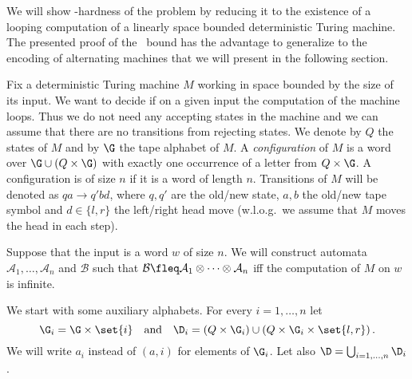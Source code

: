 \documentclass{LMCS}
\theoremstyle{plain}\newtheorem{remark}{Remark}
\theoremstyle{plain}\newtheorem{lemma}[thm]{Lemma}
\renewcommand{\Aa}{\mathcal{A}}
\renewcommand{\Bb}{\mathcal{B}}
\newcommand{\trans}[1]{\stackrel{#1}{\longrightarrow}}
\begin{document}
We will show \PSPACE-hardness of the problem by reducing it
to the  existence of a looping computation of a linearly space bounded
deterministic Turing machine. The presented proof of the \PSPACE\ bound 
has the advantage to generalize to the encoding of
alternating machines that we will present in the following section. 

Fix a deterministic Turing machine $M$ working in space bounded by the
size of its input. We want to decide if on a given input the
computation of the machine loops. Thus we do not need any accepting
states in the machine and we can assume that there are no transitions
from rejecting states. We denote by $Q$ the states of $M$ and by $\G$
the tape alphabet of $M$. A \emph{configuration} of $M$ is a word over
$\G\cup( Q\times\G)$ with exactly one occurrence of a letter from
$Q\times \G$. A configuration is of size  $n$ if it is a word of
length $n$. Transitions of $M$ will be denoted as $qa \trans{} q'bd$,
where $q,q'$ are the old/new state, $a,b$ the old/new tape symbol and
$d \in \{l,r\}$ the left/right head move (w.l.o.g.~we assume that $M$
moves the head in each step). 

Suppose that the input is a word $w$ of size $n$. We will construct
automata $\Aa_1,\dots,\Aa_n$ and $\Bb$ such that 
$\Bb \fleq \Aa_1\otimes\dots\otimes\Aa_n$ 
iff the computation of $M$ on $w$ is infinite. 

We start with some auxiliary alphabets. For every $i=1,\dots,n$ let
\begin{equation*}
\G_i=\G\times\set{i}\quad \text{and}\quad \D_i=(Q\times\G_i)\cup (Q\times\G_i\times\set{l,r})\, .
\end{equation*}
We will write $a_i$ instead of $(a,i)$ for elements of $\G_i$. Let also
$\D=\bigcup_{i=1,\dots,n} \D_i$.
\end{document}
